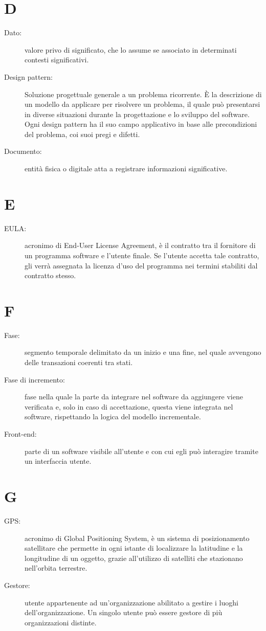 \documentclass{article}
\begin{document}
	\section{D}
	\begin{description}
		\item[Dato:] valore privo di significato, che lo assume se associato in determinati contesti significativi.
		\item[Design pattern:] Soluzione progettuale generale a un problema ricorrente. È la descrizione di un modello da applicare per risolvere un problema, il quale può presentarsi in diverse situazioni durante la progettazione e lo sviluppo del software. Ogni design pattern ha il suo campo applicativo in base alle precondizioni del problema, coi suoi pregi e difetti.
		\item[Documento:] entità fisica o digitale atta a registrare informazioni significative.
	\end{description}
	\newpage
	\section{E}
	\begin{description}
		\item[EULA:] acronimo di End-User License Agreement, è il contratto tra il fornitore di un programma software e l'utente finale. Se l'utente accetta tale contratto, gli verrà assegnata la licenza d'uso del programma nei termini stabiliti dal contratto stesso.
	\end{description}
	\newpage
	\section{F}
	\begin{description}
		\item[Fase:] segmento temporale delimitato da un inizio e una fine, nel quale avvengono delle transazioni coerenti tra stati.
		\item[Fase di incremento:] fase nella quale la parte da integrare nel software da aggiungere viene verificata e, solo in caso di accettazione, questa viene integrata nel software, rispettando la logica del modello incrementale.
		\item[Front-end:] parte di un software visibile all'utente e con cui egli può interagire tramite un interfaccia utente.
	\end{description}
	\newpage
	\section{G}
	\begin{description}
		\item[GPS:] acronimo di Global Positioning System, è un sistema di posizionamento satellitare che permette in ogni istante di localizzare la latitudine e la longitudine di un oggetto, grazie all'utilizzo di satelliti che stazionano nell'orbita terrestre.
		\item[Gestore:] utente appartenente ad un'organizzazione abilitato a gestire i luoghi dell'organizzazione. Un singolo utente può essere gestore di più organizzazioni distinte.
	\end{description}
	\newpage
\end{document}
